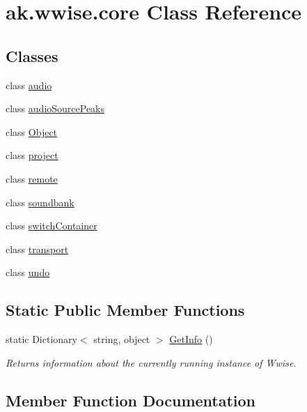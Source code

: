 \hypertarget{classak_1_1wwise_1_1core}{}\section{ak.\+wwise.\+core Class Reference}
\label{classak_1_1wwise_1_1core}
\subsection*{Classes}
\begin{DoxyCompactItemize}
\item 
class \mbox{\hyperlink{classak_1_1wwise_1_1core_1_1audio}{audio}}
\item 
class \mbox{\hyperlink{classak_1_1wwise_1_1core_1_1audio_source_peaks}{audio\+Source\+Peaks}}
\item 
class \mbox{\hyperlink{classak_1_1wwise_1_1core_1_1_object}{Object}}
\item 
class \mbox{\hyperlink{classak_1_1wwise_1_1core_1_1project}{project}}
\item 
class \mbox{\hyperlink{classak_1_1wwise_1_1core_1_1remote}{remote}}
\item 
class \mbox{\hyperlink{classak_1_1wwise_1_1core_1_1soundbank}{soundbank}}
\item 
class \mbox{\hyperlink{classak_1_1wwise_1_1core_1_1switch_container}{switch\+Container}}
\item 
class \mbox{\hyperlink{classak_1_1wwise_1_1core_1_1transport}{transport}}
\item 
class \mbox{\hyperlink{classak_1_1wwise_1_1core_1_1undo}{undo}}
\end{DoxyCompactItemize}
\subsection*{Static Public Member Functions}
\begin{DoxyCompactItemize}
\item 
static Dictionary$<$ string, object $>$ \mbox{\hyperlink{classak_1_1wwise_1_1core_a0794d63ebaa3fc1a3c79d155978030ce}{Get\+Info}} ()
\begin{DoxyCompactList}\small\item\em Returns information about the currently running instance of Wwise. \end{DoxyCompactList}\end{DoxyCompactItemize}


\subsection{Member Function Documentation}
\mbox{\label{classak_1_1wwise_1_1core_a0794d63ebaa3fc1a3c79d155978030ce}} 
